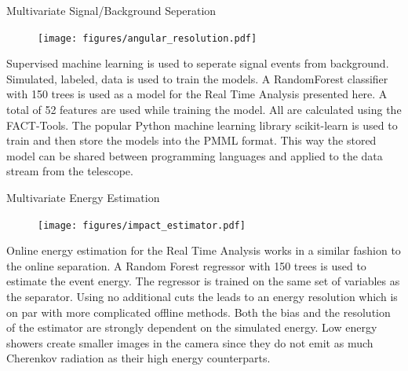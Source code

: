 \begin{multicols}{2}
    \begin{block}[equal height group=A]{Multivariate Signal/Background Seperation}%
      \begin{multicols}{2}
        \begin{figure}
          \texttt{[image: figures/angular\_resolution.pdf]}\\
        \end{figure}
        \columnbreak
        Supervised machine learning is used to seperate signal events from background.
        Simulated, labeled, data is used to train the models.
        A RandomForest classifier with \num{150} trees is
        used as a model for the Real Time Analysis presented here. A total of \num{52} features are used
        while training the model. All are calculated using the FACT-Tools.
        The popular Python machine learning library scikit-learn is used to train and then
        store the models into the PMML format. This way the stored model can be shared
        between programming languages and applied to the data stream from the telescope.



      \end{multicols}
    \end{block}%

    \begin{block}[equal height group=A]{Multivariate Energy Estimation}%
      \begin{multicols}{2}
        \begin{figure}
          \texttt{[image: figures/impact\_estimator.pdf]}\\
        \end{figure}
        \columnbreak
        Online energy estimation for the Real Time Analysis works in a similar fashion to the online separation.
        A Random Forest regressor with \num{150} trees is used to estimate the event energy.
        The regressor is trained on the same set of variables as the separator.
        Using no additional cuts the leads to an energy resolution which is on par with more complicated
        offline methods. Both the bias and the resolution of the estimator are strongly dependent on the simulated energy.
        Low energy showers create smaller images in the camera since they do not emit as much Cherenkov radiation as their high energy counterparts.
      \end{multicols}
    \end{block}%


\end{multicols}
